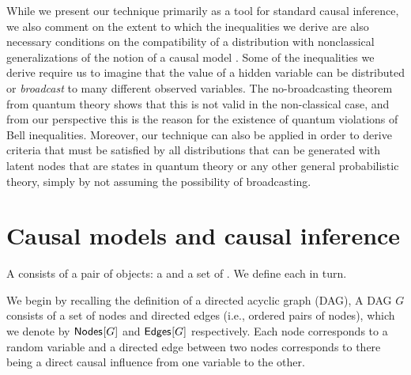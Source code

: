 While we present our technique primarily as a tool for standard causal inference, we also comment on the extent to which the inequalities we derive are also necessary conditions on the compatibility of a distribution with nonclassical generalizations of the notion of a causal model \cite{fritz2012bell,pusey2014gdag,chaves2014informationinference,BeyondBellII}.
Some of the inequalities we derive require us to imagine that the value of a hidden variable can be distributed or \emph{broadcast} to many different observed variables. 
The no-broadcasting theorem from quantum theory shows that this is not valid in the non-classical case, and from our perspective this is the reason for the existence of quantum violations of Bell inequalities. Moreover, our technique can also be applied in order to derive criteria that must be satisfied by all distributions that can be generated with latent nodes that are states in quantum theory or any other general probabilistic theory, simply by not assuming the possibility of broadcasting. 

\section{Causal models and causal inference}\label{sec:definitions}



A  consists of a pair of objects: a  and a set of .  We define each in turn.

We begin by recalling the definition of a directed acyclic graph (DAG),  A DAG $G$ consists of a set of nodes and directed edges (i.e., ordered pairs of nodes), which we denote by ${\operatorname{\mathsf{Nodes}}_{}}\lbrack G\rbrack$ and ${\operatorname{\mathsf{Edges}}_{}}\lbrack G\rbrack$ respectively.  Each node corresponds to a random variable and a directed edge between two nodes corresponds to there being a direct causal influence from one variable to the other.   

